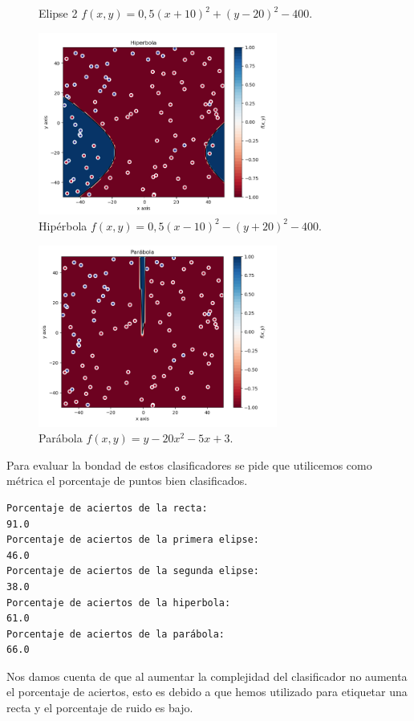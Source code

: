 \documentclass[size=a4, parskip=half, titlepage=false, toc=flat, toc=bib, 12pt]{scrartcl}
\begin{document}
\begin{enumerate}
\begin{enumerate}
\begin{figure}[H]
\caption{Elipse 2 $f(x, y) = 0,5(x + 10)^2 + (y − 20)^2 − 400$.}
\end{figure}
\begin{figure}[H]
\centering
\includegraphics[width=0.7\textwidth]{./img/hiperbola}
\caption{Hipérbola $f(x, y) = 0,5(x − 10)^2 − (y + 20)^2 − 400$.}
\end{figure}
\begin{figure}[H]
\centering
\includegraphics[width=0.7\textwidth]{./img/parabola}
\caption{Parábola $f(x, y) = y − 20x^2 − 5x + 3$.}
\end{figure}
Para evaluar la bondad de estos clasificadores se pide que utilicemos como métrica el porcentaje de puntos bien clasificados.
\begin{verbatim}
Porcentaje de aciertos de la recta:
91.0
Porcentaje de aciertos de la primera elipse:
46.0
Porcentaje de aciertos de la segunda elipse:
38.0
Porcentaje de aciertos de la hiperbola:
61.0
Porcentaje de aciertos de la parábola:
66.0
\end{verbatim}

Nos damos cuenta de que al aumentar la complejidad del clasificador no aumenta el porcentaje de aciertos, esto es debido a que hemos utilizado para etiquetar una recta y el porcentaje de ruido es bajo.


\end{enumerate}
\end{enumerate}
\end{document}

